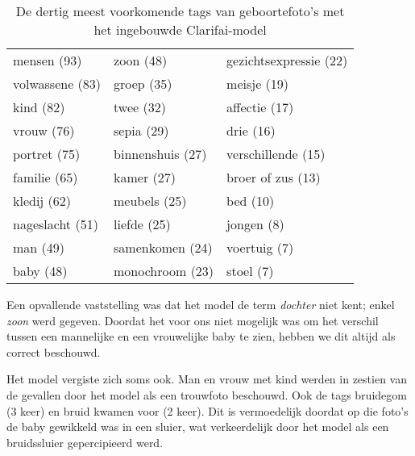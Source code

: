 \begin{table}
	\centering
	\begin{tabular}{*{3}{l}}
		mensen (93) & zoon (48) & gezichtsexpressie (22) \\
		volwassene (83) & 	groep (35) & meisje (19) \\
		kind (82) & twee (32) & affectie (17) \\
		vrouw (76) & sepia (29) & drie (16) \\
		portret (75) & binnenshuis (27) & verschillende (15) \\
		familie (65) & 	kamer (27) & broer of zus (13) \\
		kledij (62) & 	meubels (25) & bed (10) \\
		nageslacht (51) & liefde (25) & jongen (8) \\
		man (49) & samenkomen (24) & voertuig (7) \\
		baby (48) & monochroom (23) & stoel (7) \\	
	\end{tabular}
	\caption{De dertig meest voorkomende tags van geboortefoto's met het ingebouwde Clarifai-model}
	\label{tab:30-termen-geboorte}
\end{table}

Een opvallende vaststelling was dat het model de term \textit{dochter} niet kent; enkel \textit{zoon} werd gegeven. Doordat het voor ons niet mogelijk was om het verschil tussen een mannelijke en een vrouwelijke baby te zien, hebben we dit altijd als correct beschouwd.

Het model vergiste zich soms ook. Man en vrouw met kind werden in zestien van de gevallen door het model als een trouwfoto beschouwd. Ook de tags bruidegom (3 keer) en bruid kwamen voor (2 keer). Dit is vermoedelijk doordat op die foto’s de baby gewikkeld was in een sluier, wat verkeerdelijk door het model als een bruidssluier gepercipieerd werd.